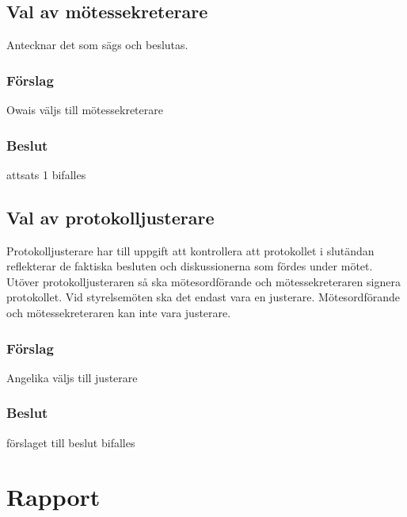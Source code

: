 \documentclass[protokoll]{dvd}
\begin{document}
\subsection{Val av mötessekreterare}
Antecknar det som sägs och beslutas.

\subsubsection*{Förslag}
\begin{attsatser}
    \item Owais väljs till mötessekreterare
\end{attsatser}
\subsubsection*{Beslut}
\begin{attsatser}
    \item attsats 1 bifalles
\end{attsatser}

\subsection{Val av protokolljusterare}

Protokolljusterare har till uppgift att kontrollera att protokollet i slutändan reflekterar de faktiska besluten och diskussionerna som fördes under mötet.
Utöver protokolljusteraren så ska mötesordförande och mötessekreteraren signera protokollet.
Vid styrelsemöten ska det endast vara en justerare.
Mötesordförande och mötessekreteraren kan inte vara justerare.

\subsubsection*{Förslag}
\begin{attsatser}
    \item Angelika väljs till justerare
\end{attsatser}
\subsubsection*{Beslut}
\begin{attsatser}
    \item förslaget till beslut bifalles
\end{attsatser}

\section{Rapport} 
\end{document}
